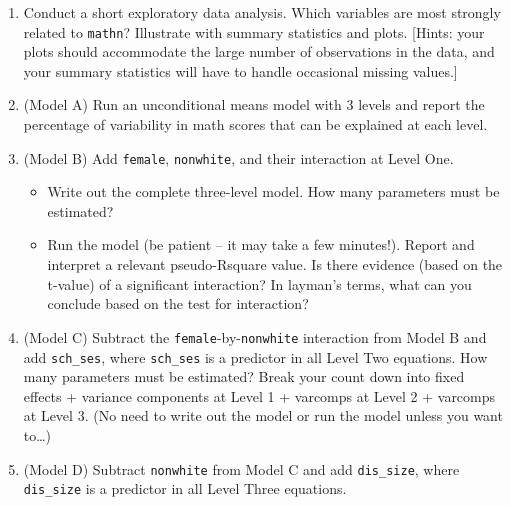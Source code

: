 \documentclass[
]{krantz}
\providecommand{\tightlist}{%
  \setlength{\itemsep}{0pt}\setlength{\parskip}{0pt}}
\begin{document}
\begin{enumerate}
  \begin{enumerate}
  \def\labelenumii{\alph{enumii}.}
  \tightlist
  \item
    Conduct a short exploratory data analysis. Which variables are most strongly related to
    \texttt{mathn}? Illustrate with summary statistics and plots. {[}Hints: your plots should accommodate
    the large number of observations in the data, and your summary statistics will have to
    handle occasional missing values.{]}\\
  \item
    (Model A) Run an unconditional means model with 3 levels and report the percentage of
    variability in math scores that can be explained at each level.\\
  \item
    (Model B) Add \texttt{female}, \texttt{nonwhite}, and their interaction at Level One.

    \begin{itemize}
    \tightlist
    \item
      Write out the complete three-level model. How many parameters must be estimated?\\
    \item
      Run the model (be patient -- it may take a few minutes!). Report and interpret a relevant
      pseudo-Rsquare value. Is there evidence (based on the t-value) of a significant interaction?
      In layman's terms, what can you conclude based on the test for interaction?\\
    \end{itemize}
  \item
    (Model C) Subtract the \texttt{female}-by-\texttt{nonwhite} interaction from Model B and add \texttt{sch\_ses},
    where \texttt{sch\_ses} is a predictor in all Level Two equations. How many parameters must be
    estimated? Break your count down into fixed effects + variance components at Level 1 +
    varcomps at Level 2 + varcomps at Level 3. (No need to write out the model or run the model
    unless you want to\ldots)\\
  \item
    (Model D) Subtract \texttt{nonwhite} from Model C and add \texttt{dis\_size}, where \texttt{dis\_size} is a
    predictor in all Level Three equations.


\end{enumerate}
\end{enumerate}
\end{document}
